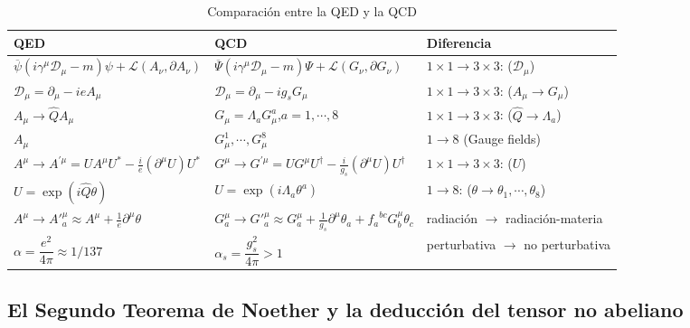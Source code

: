 \begin{frame}
  \begin{table}
    \centering
    \small
    \begin{tabular}{l|l|l}
      QED & QCD & Diferencia\\\hline
$      \overline{\psi}\left(i\gamma^\mu\mathcal{D}_\mu-m\right)\psi +\mathcal{L} \left(A_{\nu},\partial A_{\nu}  \right)$ & $      \overline{\Psi}\left(i\gamma^\mu\mathcal{D}_\mu-m\right)\Psi +\mathcal{L} \left(G_{\nu},\partial G_{\nu}  \right)$ & $1\times 1 \to 3\times 3$: ($\mathcal{D}_{\mu}$)\\ 
$\mathcal{D}_{\mu}=\partial_{\mu}-i e A_{\mu}$ & $\mathcal{D}_{\mu}=\partial_{\mu}-i g_s G_{\mu}$ & $1\times 1 \to 3\times 3$: ($A_{\mu}\to G_{\mu}$)\\ 
$A_{\mu}\to \widehat{Q}A_{\mu}$ & $G_{\mu}=\Lambda_{a} G_{\mu}^{a}$,\qquad $a=1,\cdots,8$ & $1\times 1 \to 3\times 3$: ($\widehat{Q}\to\Lambda_{a}$)\\ 
$A_{\mu}$&$ G_{\mu}^1,\cdots ,G_{\mu}^8$& $1\to 8$ (Gauge fields)\\
$    {A}^\mu\to {A}^{\prime\mu}=U{A}^\mu U^{*}-\frac{i}{e}\left(\partial^\mu U\right)U^*$&
$ {G}^\mu\to {G}^{\prime\mu}=U{G}^\mu U^{\dagger}-\frac{i}{g_s}\left(\partial^\mu U\right)U^\dagger$
&$1\times 1 \to 3\times 3$: ($U$)\\ 
$U=\exp(i\widehat{Q}\theta)$ & $U=\exp(i\Lambda_{a}\theta^{a})$& $1\to 8$: ($\theta\to\theta_{1},\cdots,\theta_{8}$) \\
      $A^\mu\to {A'}^\mu_a\approx A^\mu+\frac{1}{e}\partial^\mu\theta$ &
$G^\mu_a\to {G'}^\mu_a\approx G^\mu_a+\frac{1}{g_s}\partial^\mu\theta_a+{f_a}^{bc}G^\mu_b\theta_c$ &\parbox{3.5cm}{radiación $\to$ ra\-dia\-ción\--ma\-teria}  \\
$\alpha=\dfrac{e^2}{4\pi}\approx 1/137$ & $\alpha_s=\dfrac{g_s^2}{4\pi}>1$ & \parbox{3.5cm}{perturbativa $\to$ no per\-tur\-ba\-ti\-va}  \\
    \end{tabular}
    \caption{Comparación entre la QED y la QCD}
  \end{table}
\end{frame}



\subsection{El Segundo Teorema de Noether y la deducción del tensor no abeliano}
\label{sec:noether_deduccion_tensor}

